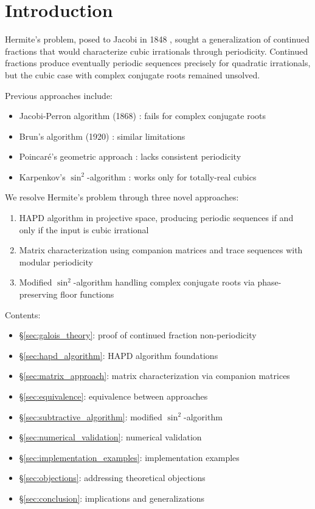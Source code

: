 \section{Introduction}\label{sec:intro}

Hermite's problem, posed to Jacobi in 1848 \cite{Hermite1848}, sought a generalization of continued fractions that would characterize cubic irrationals through periodicity. Continued fractions produce eventually periodic sequences precisely for quadratic irrationals, but the cubic case with complex conjugate roots remained unsolved.

Previous approaches include:
\begin{itemize}
\item Jacobi-Perron algorithm (1868) \cite{Jacobi1868}: fails for complex conjugate roots
\item Brun's algorithm (1920) \cite{Brentjes1981}: similar limitations
\item Poincaré's geometric approach \cite{KarpenkovBook}: lacks consistent periodicity
\item Karpenkov's $\sin^2$-algorithm \cite{Karpenkov2019}: works only for totally-real cubics
\end{itemize}

We resolve Hermite's problem through three novel approaches:
\begin{enumerate}
\item HAPD algorithm in projective space, producing periodic sequences if and only if the input is cubic irrational
\item Matrix characterization using companion matrices and trace sequences with modular periodicity
\item Modified $\sin^2$-algorithm handling complex conjugate roots via phase-preserving floor functions
\end{enumerate}

Contents:
\begin{itemize}
\item \S\ref{sec:galois_theory}: proof of continued fraction non-periodicity
\item \S\ref{sec:hapd_algorithm}: HAPD algorithm foundations
\item \S\ref{sec:matrix_approach}: matrix characterization via companion matrices
\item \S\ref{sec:equivalence}: equivalence between approaches
\item \S\ref{sec:subtractive_algorithm}: modified $\sin^2$-algorithm
\item \S\ref{sec:numerical_validation}: numerical validation
\item \S\ref{sec:implementation_examples}: implementation examples
\item \S\ref{sec:objections}: addressing theoretical objections
\item \S\ref{sec:conclusion}: implications and generalizations
\end{itemize}

